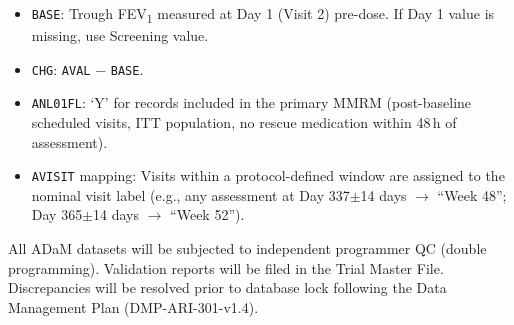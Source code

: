 \begin{itemize}[leftmargin=1.6em, itemsep=2pt]
  \item \texttt{BASE}: Trough FEV\textsubscript{1} measured at Day 1 (Visit 2) pre-dose.
        If Day 1 value is missing, use Screening value.
  \item \texttt{CHG}: \texttt{AVAL} $-$ \texttt{BASE}.
  \item \texttt{ANL01FL}: \textquoteleft{}Y\textquoteright{} for records included in the
        primary MMRM (post-baseline scheduled visits, ITT population, no rescue medication
        within 48\,h of assessment).
  \item \texttt{AVISIT} mapping: Visits within a protocol-defined window are assigned to
        the nominal visit label (e.g., any assessment at Day 337$\pm$14 days $\rightarrow$
        ``Week 48''; Day 365$\pm$14 days $\rightarrow$ ``Week 52'').
\end{itemize}

\begin{tcolorbox}[sapnote, title={\faIcon{database}\ Data Validation}]
  All ADaM datasets will be subjected to independent programmer QC (double programming).
  Validation reports will be filed in the Trial Master File. Discrepancies will be resolved
  prior to database lock following the Data Management Plan (DMP-ARI-301-v1.4).
\end{tcolorbox}

\clearpage

